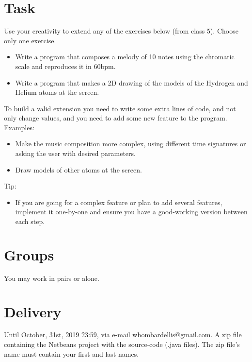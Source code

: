\documentclass[a4paper]{article}
\begin{document}
	
	
	
	\section{Task}
	Use your creativity to extend any of the exercises below (from class 5). Choose only one exercise.
	\begin{itemize}
		\item Write a program that composes a melody of 10 notes using the chromatic scale and reproduces it in 60bpm.
		\item Write a program that makes a 2D drawing of the models of the Hydrogen and Helium atoms at the screen.
	\end{itemize}
	To build a valid extension you need to write some extra lines of code, and not only change values, and you need to add some new feature to the program. Examples:
	\begin{itemize}
		\item Make the music composition more complex, using different time signatures or asking the user with desired parameters.
		\item Draw models of other atoms at the screen.
	\end{itemize}
	Tip:
	\begin{itemize}
		\item If you are going for a complex feature or plan to add several features, implement it one-by-one and ensure you have a good-working version between each step.
	\end{itemize}

	\section{Groups}
	You may work in pairs or alone.
	
	\section{Delivery}
	Until October, 31st, 2019 23:59, via e-mail wbombardellis@gmail.com. A zip file containing the Netbeans project with the source-code (.java files). The zip file's name must contain your first and last names.
\end{document}
